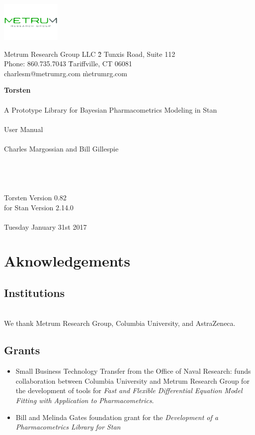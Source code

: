 \documentclass[11pt]{amsart}
\let\oldsection\section
\renewcommand\section{\clearpage\oldsection}
\begin{document}
\begin{center}
\includegraphics[height=0.75in]{graphics/logo.pdf}\\
\textcolor{MRGGreen}{\sf
\begin{tabbing}
Metrum Research Group LLC \` 2 Tunxis Road, Suite 112 \\
Phone: 860.735.7043 \` Tariffville, CT 06081 \\
charlesm@metrumrg.com \` metrumrg.com \\
\end{tabbing}
}
{\Huge \textbf{Torsten} \\ \ \\  \huge A Prototype Library for Bayesian Pharmacometrics Modeling in Stan \\ \ \\
User Manual \\ \ \\ 
\Large Charles Margossian and Bill Gillespie \\ \ \\ \ \\ \ \\ \ \\
Torsten Version 0.82 \\ for Stan Version 2.14.0 \\ \ \\ 
\large Tuesday January 31st 2017 }
\end{center}

\clearpage

\tableofcontents

\section*{Aknowledgements}

\subsection*{Institutions} \ \\
We thank Metrum Research Group, Columbia University, and AstraZeneca.

\subsection*{Grants}
\begin{itemize}
  \item Small Business Technology Transfer from the Office of Naval Research: funds collaboration between Columbia University and Metrum Research Group for the development of tools for \textit{Fast and Flexible Differential Equation Model Fitting with Application to Pharmacometrics}.
  \item  Bill and Melinda Gates foundation grant for the \textit{Development of a Pharmacometrics Library for Stan}
\end{itemize}
\end{document}
